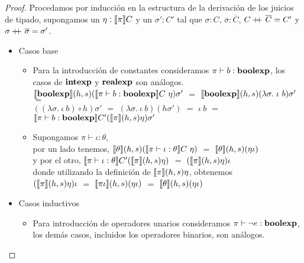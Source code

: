 \begin{proof}
Procedamos por inducci\'on en la estructura de la derivaci\'on de los juicios de tipado,
supongamos un $\eta : \llbracket \pi \rrbracket C$ y un $\sigma' : C'$ tal que $\sigma : C$,
$\overline{\sigma} : \overline{C}$, $C +\kern-1.3ex+\kern0.8ex \overline{C} = C'$ y 
$\sigma +\kern-1.3ex+\kern0.8ex \overline{\sigma} = \sigma'$.

\newpage

\begin{itemize}

\item Casos base
\begin{itemize}
\item Para la introducci\'on de constantes consideramos $\pi \vdash b : \textbf{boolexp}$, los
casos de $\textbf{intexp}$ y $\textbf{realexp}$ son an\'alogos.\\

$\llbracket \textbf{boolexp} \rrbracket(h,s)(\llbracket \pi \vdash b : \textbf{boolexp} \rrbracket C \ \eta) \sigma'$ $=$
$\semBrcks{\boolexp}(h,s)(\lambda \sigma. \ \iota \ b) \sigma'$ $=$ \\
$((\lambda \sigma. \ \iota \ b) \circ h)\sigma'$ $=$
$(\lambda \sigma. \ \iota \ b) (h \sigma')$ $=$
$\iota \ b$ $=$ $\llbracket \pi \vdash b : \textbf{boolexp} \rrbracket C'(\llbracket \pi \rrbracket(h,s)\eta)\sigma'$

\item Supongamos $\pi \vdash \iota : \theta$,\\

por un lado tenemos,
$\llbracket \theta \rrbracket(h,s)(\llbracket \pi \vdash \iota : \theta \rrbracket C \ \eta)$ $=$
$\llbracket \theta \rrbracket(h,s)(\eta \iota)$ \\

y por el otro, $\llbracket \pi \vdash \iota : \theta \rrbracket C'(\llbracket \pi \rrbracket(h,s)\eta)$ $=$
$(\llbracket \pi \rrbracket(h,s)\eta) \iota$ \\

donde utilizando la definici\'on de $\llbracket \pi \rrbracket(h,s)\eta$, obtenemos\\

$(\llbracket \pi \rrbracket(h,s)\eta) \iota$ $=$ $\llbracket \pi\iota \rrbracket(h,s)(\eta \iota)$ $=$
$\llbracket \theta \rrbracket(h,s)(\eta \iota)$

\end{itemize}

\item Casos inductivos
\begin{itemize}
\item Para introducci\'on de operadores unarios consideramos $\pi \vdash \neg e : \textbf{boolexp}$, los
dem\'as casos, incluidos los operadores binarios, son an\'alogos.\\


\end{itemize}
\end{itemize}
\end{proof}
